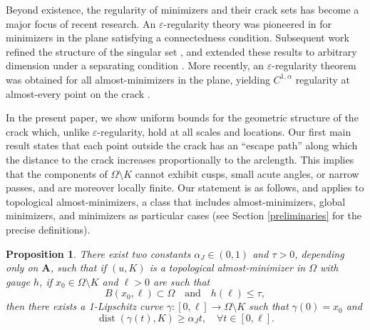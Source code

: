 \documentclass[12pt]{article}
\newtheorem{proposition}[theorem]{Proposition}
\theoremstyle{definition}
\theoremstyle{remark}
\numberwithin{equation}{section}
\DeclareMathOperator{\dist}{dist}
\newcommand{\dd}{\partial}
\newcommand{\A}{\mathbf{A}}
\begin{document}
Beyond existence, the regularity of minimizers and their crack sets has become a major focus of recent research. An 
$\varepsilon$-regularity theory was pioneered in \cite{BabadjianIurlanoLemenant} for minimizers in the plane satisfying a
connectedness condition. Subsequent work refined the structure of the singular set \cite{LabourieLemenant},
and extended these results to arbitrary dimension under a separating condition \cite{LabourieLemenant2}. More recently,
an $\varepsilon$-regularity theorem was obtained for all almost-minimizers in the plane, yielding
$C^{1,\alpha}$ regularity at almost-every point on the crack \cite{FriedrichLabourie}.

In the present paper, we show uniform bounds for the geometric structure of the crack which, unlike 
$\varepsilon$-regularity, hold at all scales and locations. Our first main result states that each point outside the
crack has an ``escape path'' along which the distance to the crack increases proportionally to the arclength. This implies
that the components of $\Omega \setminus K$ cannot exhibit cusps, small acute angles, or narrow passes, and are
moreover locally finite. Our statement is as follows, and applies to topological almost-minimizers, a class that includes almost-minimizers, global minimizers, and minimizers as particular cases (see Section \ref{preliminaries} for the precise definitions).

\begin{proposition}\label{intro1}
    There exist two constants $\alpha_J\in(0,1)$ and $\tau>0$, depending only on $\A$, such that if $(u,K)$ is
    a topological almost-minimizer in $\Omega$ with gauge $h$, if $x_0\in\Omega\setminus K$ and $\ell > 0$ are such that
    \begin{equation}
        B(x_0,\ell) \subset \Omega \quad \text{and} \quad h(\ell) \leq \tau,
    \end{equation}
    then there exists a 1-Lipschitz curve $\gamma\colon[0,\ell]\longrightarrow\Omega\setminus K$ such that $\gamma(0)=x_0$ and
    \begin{equation*}
        \dist(\gamma(t),K)\geq \alpha_J t,\quad\forall t\in[0,\ell].
    \end{equation*}
\end{proposition}
\end{document}

